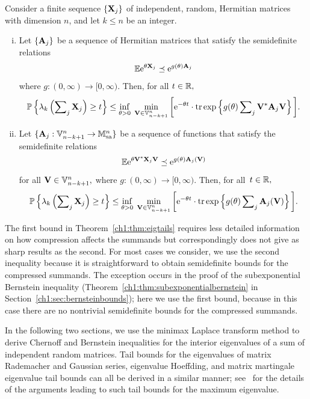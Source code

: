 \begin{thm}
Consider a finite sequence $\{\mathbf{X}_j\}$ of independent, random, Hermitian
matrices with dimension $n$, and let $k\leq n$ be an integer.
\begin{enumerate}[(i)]
 \item Let $\{\mathbf{A}_j\}$ be a sequence of Hermitian matrices that satisfy
the semidefinite relations
\[
 \mathbb{E}\mathrm{e}^{\theta \mathbf{X}_j} \preceq \mathrm{e}^{g(\theta) \mathbf{A}_j}
\]
where $g : (0,\infty) \rightarrow [0, \infty).$ Then, for all $t \in \mathbb{R},$ 
\[
 \mathbb{P}\left\{\lambda_k\left(\sum\nolimits_j \mathbf{X}_j \right) \geq t \right\} \leq
\inf_{\theta > 0}\; \min_{\mathbf{V} \in \mathbb{V}_{n-k+1}^{n}} \bigg[ \mathrm{e}^{-\theta t}
\cdot \operatorname{tr} \mathrm{exp}\left\{ g(\theta) \sum\nolimits_j \mathbf{V}^* \mathbf{A}_j
\mathbf{V}\right\}\bigg].
\]
 \label{ch1:eqn:uncompressedeigtails}
\item Let $\{\mathbf{A}_j:\mathbb{V}_{n-k+1}^{n} \rightarrow \mathbb{M}^{n}_{\mathrm{sa}} \}$ be a sequence
of functions that satisfy the semidefinite relations 
\[
 \mathbb{E}\mathrm{e}^{\theta\mathbf{V}^* \mathbf{X}_j \mathbf{V}} \preceq \mathrm{e}^{g(\theta)
\mathbf{A}_j(\mathbf{V})}
\]
for all $\mathbf{V} \in \mathbb{V}_{n-k+1}^{n},$ where $g : (0, \infty) \rightarrow [0,
\infty).$ Then, for all~$t \in \mathbb{R},$
\[
 \mathbb{P}\left\{\lambda_k\left(\sum\nolimits_j \mathbf{X}_j \right) \geq t \right\} \leq
\inf_{\theta > 0 } \; \min_{\mathbf{V} \in \mathbb{V}_{n-k+1}^{n}} \bigg[ \mathrm{e}^{-\theta t}
\cdot \operatorname{tr} \mathrm{exp}\left\{ g(\theta) \sum\nolimits_j \mathbf{A}_j(\mathbf{V})
\right\}\bigg].
\]
 \label{ch1:eqn:compressedeigtails}
\end{enumerate}

\label{ch1:thm:eigtails}
\end{thm}

The first bound in Theorem~\ref{ch1:thm:eigtails} requires less detailed information
on how compression affects the summands but correspondingly does not give as
sharp results as the second. For most cases we consider, we use the second
 inequality because it is straightforward to obtain semidefinite bounds for the
 compressed summands. The exception occurs in the proof of the subexponential
 Bernstein inequality (Theorem~\ref{ch1:thm:subexponentialbernstein} in 
 Section~\ref{ch1:sec:bernsteinbounds}); here we use the first bound, because in this case
 there are no nontrivial semidefinite bounds for the compressed summands.

In the following two sections, we use the minimax Laplace transform method to
derive Chernoff and Bernstein inequalities for the interior eigenvalues of a sum
of independent random matrices. Tail bounds for the eigenvalues of matrix
Rademacher and Gaussian series, eigenvalue Hoeffding, and matrix martingale
eigenvalue tail bounds can all be derived in a similar manner; see~\cite{T10a}
for the details of the arguments leading to such tail bounds for the maximum
eigenvalue.



